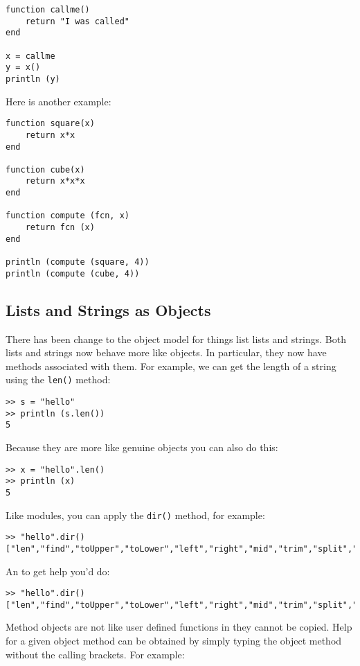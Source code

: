\begin{lstlisting}
function callme()
    return "I was called"
end

x = callme
y = x()
println (y)
\end{lstlisting}

Here is another example:

\begin{lstlisting}
function square(x)
    return x*x
end

function cube(x)
    return x*x*x
end

function compute (fcn, x)
    return fcn (x)
end

println (compute (square, 4))
println (compute (cube, 4))
\end{lstlisting}

\subsection{Lists and Strings as Objects}

There has been change to the object model for things list lists and strings. Both lists and strings now behave more like objects. In particular, they now have methods associated with them. For example, we can get the length of a string using the {\tt len()} method:

\begin{lstlisting}
>> s = "hello"
>> println (s.len())
5
\end{lstlisting}

Because they are more like genuine objects you can also do this:

\begin{lstlisting}
>> x = "hello".len()
>> println (x)
5
\end{lstlisting}

Like modules, you can apply the {\tt dir()} method, for example:

\begin{lstlisting}
>> "hello".dir()
["len","find","toUpper","toLower","left","right","mid","trim","split","dir"]
\end{lstlisting}

An to get help you'd do:

\begin{lstlisting}
>> "hello".dir()
["len","find","toUpper","toLower","left","right","mid","trim","split","dir"]
\end{lstlisting}

Method objects are not like user defined functions in they cannot be copied. Help for a given object method can be obtained by simply typing the object method without the calling brackets. For example:

